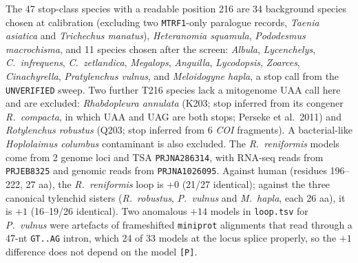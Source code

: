 \documentclass[11pt, a4paper]{article}
\begin{document}
The 47 stop-class species with a readable position 216 are 34 background species chosen at calibration (excluding two \texttt{MTRF1}-only paralogue records, \textit{Taenia asiatica} and \textit{Trichechus manatus}), \textit{Heteranomia squamula}, \textit{Pododesmus macrochisma}, and 11 species chosen after the screen: \textit{Albula}, \textit{Lycenchelys}, \textit{C.\ infrequens}, \textit{C.\ zetlandica}, \textit{Megalops}, \textit{Anguilla}, \textit{Lycodopsis}, \textit{Zoarces}, \textit{Cinachyrella}, \textit{Pratylenchus vulnus}, and \textit{Meloidogyne hapla}, a stop call from the \texttt{UNVERIFIED} sweep. Two further T216 species lack a mitogenome UAA call here and are excluded: \textit{Rhabdopleura annulata} (K203; stop inferred from its congener \textit{R.\ compacta}, in which UAA and UAG are both stops; Perseke et al.\ 2011) and \textit{Rotylenchus robustus} (Q203; stop inferred from 6 \textit{COI} fragments). A bacterial-like \textit{Hoplolaimus columbus} contaminant is also excluded. The \textit{R.\ reniformis} models come from 2 genome loci and TSA \texttt{PRJNA286314}, with RNA-seq reads from \texttt{PRJEB8325} and genomic reads from \texttt{PRJNA1026095}. Against human (residues 196--222, 27 aa), the \textit{R.\ reniformis} loop is $+0$ (21/27 identical); against the three canonical tylenchid sisters (\textit{R.\ robustus}, \textit{P.\ vulnus} and \textit{M.\ hapla}, each 26 aa), it is $+1$ (16--19/26 identical). Two anomalous $+14$ models in \texttt{loop.tsv} for \textit{P.\ vulnus} were artefacts of frameshifted \texttt{miniprot} alignments that read through a 47-nt \texttt{GT..AG} intron, which 24 of 33 models at the locus splice properly, so the $+1$ difference does not depend on the model \texttt{[P]}.
\end{document}
